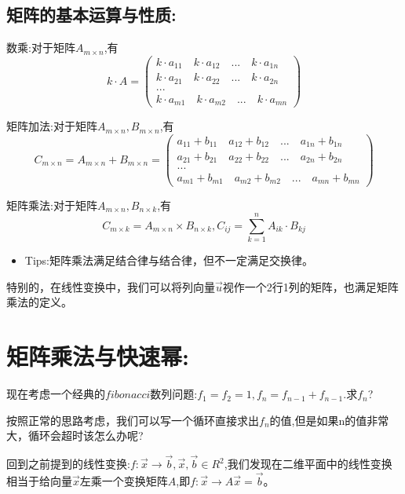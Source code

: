 \documentclass[UTF8]{article}
\begin{document}
\subsection{矩阵的基本运算与性质:}

数乘:对于矩阵$A_{m\times n}$,有
$$k\cdot A = 
\left(
\begin{array}{l}
k\cdot a_{11} \quad k\cdot a_{12} \quad ... \quad k\cdot a_{1n} \\ 
k\cdot a_{21} \quad k\cdot a_{22} \quad ... \quad k\cdot a_{2n} \\
... \\
k\cdot a_{m1} \quad k\cdot a_{m2} \quad ... \quad k\cdot a_{mn}
\end{array}
\right)$$

矩阵加法:对于矩阵$A_{m\times n}, B_{m\times n}$,有
$$C_{m\times n} = A_{m\times n} + B_{m\times n} = 
\left(
\begin{array}{l}
a_{11} + b_{11} \quad a_{12} + b_{12} \quad ... \quad a_{1n} + b_{1n} \\ 
a_{21} + b_{21} \quad a_{22} + b_{22} \quad ... \quad a_{2n} + b_{2n} \\
... \\
a_{m1} + b_{m1} \quad a_{m2} + b_{m2} \quad ... \quad a_{mn} + b_{mn}
\end{array}
\right)$$

矩阵乘法:对于矩阵$A_{m\times n}, B_{n\times k}$,有
$$C_{m\times k} = A_{m\times n} \times B_{n\times k},C_{ij} = \sum_{k = 1}^{n}{A_{ik}\cdot B_{kj}}$$

\begin{itemize}
	\item Tips:矩阵乘法满足结合律与结合律，但不一定满足交换律。
\end{itemize}

特别的，在线性变换中，我们可以将列向量$\vec{u}$视作一个2行1列的矩阵，也满足矩阵乘法的定义。


\section{矩阵乘法与快速幂:}


现在考虑一个经典的$fibonacci$数列问题:$f_1 = f_2 = 1, f_n = f_{n-1} + f_{n-1}$.求$f_n$?

按照正常的思路考虑，我们可以写一个循环直接求出$f_n$的值,但是如果n的值非常大，循环会超时该怎么办呢?

回到之前提到的线性变换:$f:\vec{x}\rightarrow \vec{b}, \vec{x}, \vec{b}\in R^2$,我们发现在二维平面中的线性变换相当于给向量$\vec{x}$左乘一个变换矩阵$A$,即$f:\vec{x} \rightarrow A \vec{x} = \vec{b}$。
\end{document}
